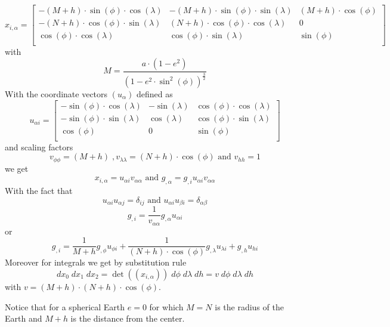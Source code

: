 \begin{equation}
 x_{i,\alpha}
= 
\left[
\begin{array}{ccc}
-(M + h) \cdot \sin(\phi) \cdot  \cos(\lambda) & -(M + h) \cdot  \sin(\phi) \cdot  \sin(\lambda) & (M  + h )  \cdot  \cos(\phi) \\
 - (N + h) \cdot \cos(\phi) \cdot  \sin(\lambda) & (N + h)  \cdot  \cos(\phi) \cdot  \cos(\lambda) & 0 \\
 \cos(\phi) \cdot  \cos(\lambda)  & \cos(\phi) \cdot  \sin(\lambda) &   \sin(\phi) \\
\end{array}
\right]
\end{equation}
with 
\begin{equation}
 M = \frac{a \cdot  (1-e^2) }{(1- e^2 \cdot \sin^2(\phi))^{\frac{3}{2}}}
\label{equ:geodetic:5}
\end{equation}
With the coordinate vectors $(u_{\alpha})$ defined as 
\begin{equation}
 u_{\alpha i}
= 
\left[
\begin{array}{ccc}
-\sin(\phi) \cdot  \cos(\lambda)  & -  \sin(\lambda) &  \cos(\phi) \cdot  \cos(\lambda)  \\
- \sin(\phi) \cdot  \sin(\lambda)  &  \cos(\lambda)  &  \cos(\phi) \cdot  \sin(\lambda)  \\
\cos(\phi)                       &   0               &   \sin(\phi)  \\
\end{array}
\right]
\end{equation}
and scaling factors 
\begin{equation}
v_{\phi \phi} = (M + h) \; , 
v_{\lambda \lambda} =  (N + h) \cdot \cos(\phi) \mbox{ and }
v_{h h} = 1
\end{equation}
we get 
\begin{equation}
 x_{i,\alpha} =  u_{\alpha i} v_{\alpha \alpha} \mbox{ and }   g_{,\alpha}   =    g_{,i} u_{\alpha i} v_{\alpha \alpha} 
\end{equation}
With the fact that 
\begin{equation}
 u_{\alpha i} u_{\alpha j} = \delta_{ij} \mbox{ and }  u_{\alpha i} u_{\beta i} = \delta_{\alpha \beta}
\end{equation}
\begin{equation}
g_{,i} = \frac{1}{ v_{\alpha \alpha}} g_{,\alpha}  u_{\alpha i} 
\end{equation}
or 
\begin{equation}
g_{,i} = \frac{1}{M + h} g_{,\phi}  u_{\phi i} + 
\frac{1}{(N + h) \cdot \cos(\phi) } g_{,\lambda}  u_{\lambda i} +
g_{,h}  u_{h i} 
\end{equation} 
Moreover for integrals we get by substitution rule 
\begin{equation}
dx_0 \; dx_1  \;  dx_2 =\det((x_{i,\alpha}))  \;  d \phi  \;   d\lambda   \;  dh = v \;  d \phi  \;   d\lambda   \;  dh
\end{equation} 
with  $v= (M + h) \cdot (N + h) \cdot \cos(\phi)$.

Notice that for a spherical Earth $e=0$ for which $M=N$ is the radius of the Earth and $M+h$ is the distance from
the center.  
